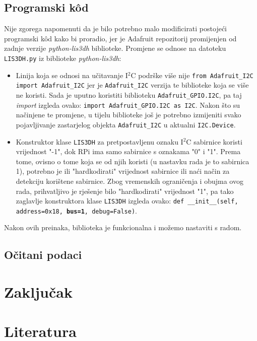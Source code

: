 \documentclass[12pt,a4paper]{article}
\begin{document}
	

	\subsection{Programski kôd}


	Nije zgorega napomenuti da je bilo potrebno malo modificirati postojeći programski kôd kako bi proradio, jer je Adafruit repozitorij promijenjen od zadnje verzije \textit{python-lis3dh} biblioteke. Promjene se odnose na datoteku \texttt{LIS3DH.py} iz biblioteke \textit{python-lis3dh}:
		\begin{itemize}
			\item Linija koja se odnosi na učitavanje I$^2$C podrške više nije 
			\texttt{from Adafruit\_I2C import Adafruit\_I2C} jer je \texttt{Adafruit\_I2C} verzija te biblioteke koja se više ne koristi. Sada je uputno koristiti biblioteku \texttt{Adafruit\_GPIO.I2C}, pa taj \textit{import} izgleda ovako:
			\texttt{import Adafruit\_GPIO.I2C as I2C}. 
			Nakon što su načinjene te promjene, u tijelu biblioteke još je potrebno izmijeniti svako pojavljivanje zastarjelog objekta \texttt{Adafruit\_I2C} u aktualni \texttt{I2C.Device}.
			\item Konstruktor klase \texttt{LIS3DH} za pretpostavljenu oznaku I$^2$C sabirnice koristi vrijednost "-1", dok RPi ima samo sabirnice s oznakama "0" i "1". Prema tome, ovisno o tome koja se od njih koristi (u nastavku rada je to sabirnica 1), potrebno je ili "hardkodirati" vrijednost sabirnice ili naći način za detekciju korištene sabirnice. Zbog vremenskih ograničenja i obujma ovog rada, prihvatljivo je rješenje bilo "hardkodirati" vrijednost "1", pa tako zaglavlje konstruktora klase \texttt{LIS3DH} izgleda ovako: 
			\texttt{def \_\_init\_\_(self, address=0x18, \textbf{bus=1}, debug=False)}.
		\end{itemize}
		Nakon ovih preinaka, biblioteka je funkcionalna i možemo nastaviti s radom.

	\subsection{Očitani podaci}

\newpage
\section{Zaključak}

\newpage
\section{Literatura}
\end{document}

